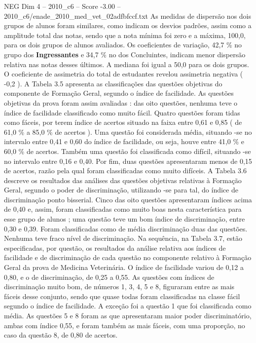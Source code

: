 \begin{textsample}{NEG Dim 4 – 2010\_c6 – Score -3.00 – 2010\_c6/enade\_2010\_med\_vet\_02adfbfccf.txt}
As medidas de dispersão nos dois grupos de alunos foram similares, como indicam os desvios padrões, assim como a amplitude total das notas, sendo que a nota mínima foi zero e a máxima, 100,0, para os dois grupos de alunos avaliados.
Os coeficientes de variação, 42,7 \% no grupo dos \textbf{Ingressantes} e 34,7 \% no dos Concluintes, indicam menor dispersão relativa nas notas desses últimos.
A mediana foi igual a 50,0 para os dois grupos.
O coeficiente de assimetria do total de estudantes revelou assimetria negativa ( -0,2 ).
A Tabela 3.5 apresenta as classificações das questões objetivas do componente de Formação Geral, segundo o índice de facilidade.
As questões objetivas da prova foram assim avaliadas : das oito questões, nenhuma teve o índice de facilidade classificado como muito fácil.
Quatro questões foram tidas como fáceis, por terem índice de acertos situado na faixa entre 0,61 e 0,85 ( de 61,0 \% a 85,0 \% de acertos ).
Uma questão foi considerada média, situando -se no intervalo entre 0,41 e 0,60 do índice de facilidade, ou seja, houve entre 41,0 \% e 60,0 \% de acertos.
Também uma questão foi classificada como difícil, situando -se no intervalo entre 0,16 e 0,40.
Por fim, duas questões apresentaram menos de 0,15 de acertos, razão pela qual foram classificadas como muito difíceis.
A Tabela 3.6 descreve os resultados das análises das questões objetivas relativas à Formação Geral, segundo o poder de discriminação, utilizando -se para tal, do índice de discriminação ponto bisserial.
Cinco das oito questões apresentaram índices acima de 0,40 e, assim, foram classificadas como muito boas nesta característica para esse grupo de alunos ; uma questão teve um bom índice de discriminação, entre 0,30 e 0,39.
Foram classificadas como de média discriminação duas das questões.
Nenhuma teve fraco nível de discriminação.
Na sequência, na Tabela 3.7, estão especificadas, por questão, os resultados da análise relativa aos índices de facilidade e de discriminação de cada questão no componente relativo à Formação Geral da prova de Medicina Veterinária.
O índice de facilidade variou de 0,12 a 0,80, e o de discriminação, de 0,25 a 0,55.
As questões com índices de discriminação muito bom, de números 1, 3, 4, 5 e 8, figuraram entre as mais fáceis desse conjunto, sendo que quase todas foram classificadas na classe fácil segundo o índice de facilidade.
A exceção foi a questão 1 que foi classificada como média.
As questões 5 e 8 foram as que apresentaram maior poder discriminatório, ambas com índice 0,55, e foram também as mais fáceis, com uma proporção, no caso da questão 8, de 0,80 de acertos.

\end{textsample}
